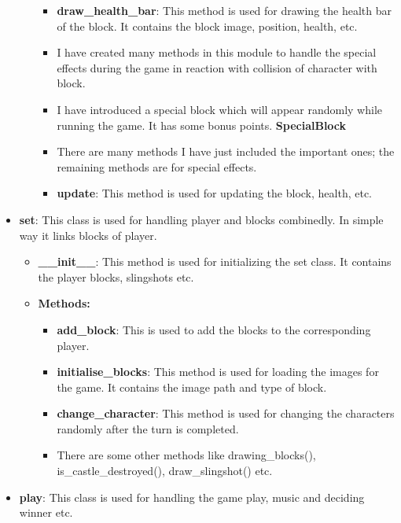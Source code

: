 \documentclass[12pt]{article}
\begin{document}
\begin{itemize}
\begin{itemize}
\begin{itemize}
                    \item \textbf{draw\_health\_bar}: This method is used for drawing the health bar of the block. It contains the block image, position, health, etc.
                    \item I have created many methods in this module to handle the special effects during the game in reaction with collision of character with block.
                    \item I have introduced a special block which will appear randomly while running the game. It has some bonus points. \textbf{SpecialBlock}
                    \item There are many methods I have just included the important ones; the remaining methods are for special effects.
                    \item \textbf{update}: This method is used for updating the block, health, etc.
                \end{itemize}    
        \end{itemize}
    \item \textbf{set}: This class is used for handling player and blocks combinedly. In simple way it links blocks of player.
        \begin{itemize}
            \item \textbf{\_\_init\_\_}: This method is used for initializing the set class. It contains the player blocks, slingshots etc.
            \item \textbf{Methods:}
                \begin{itemize}
                    \item \textbf{add\_block}: This is used to add the blocks to the corresponding player.
                    \item \textbf{initialise\_blocks}: This method is used for loading the images for the game. It contains the image path and type of block.
                    \item \textbf{change\_character}: This method is used for changing the characters randomly after the turn is completed.
                    \item There are some other methods like drawing\_blocks(), is\_castle\_destroyed(), draw\_slingshot() etc.
                \end{itemize}
        \end{itemize}    
    \item \textbf{play}: This class is used for handling the game play, music and deciding winner etc.
        \begin{itemize}

\end{itemize}
\end{itemize}
\end{document}
